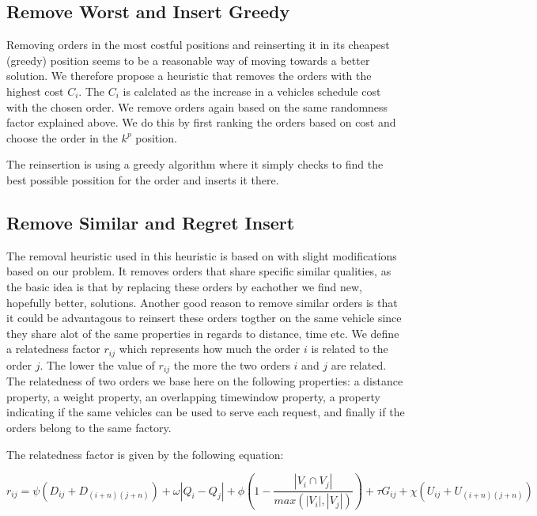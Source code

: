 \documentclass[../main.tex]{subfiles}
\begin{document}
\subsection{Remove Worst and Insert Greedy}
\label{sec:greedy}
Removing orders in the most costful positions and reinserting it in its cheapest (greedy) position seems to be a reasonable way of moving towards a better solution.
We therefore propose a heuristic that removes the orders with the highest cost $C_{i}$.
The $C_i$ is calclated as the increase in a vehicles schedule cost with the chosen order.
We remove orders again based on the same randomness factor explained above. We do this by first ranking the orders based on cost and choose the order in the $k^p$ position. \newline \par
The reinsertion is using a greedy algorithm where it simply checks to find the best possible possition for the order and inserts it there. 
\newline 
\subsection{Remove Similar and Regret Insert}
\label{sec:shaw}
The removal heuristic used in this heuristic is based on \citet{shaw97} with slight modifications based on our problem. 
It removes orders that share specific similar qualities, as the basic idea is that by replacing these orders by eachother we find new, hopefully better, solutions. 
Another good reason to remove similar orders is that it could be advantagous to reinsert these orders togther on the same vehicle since they share alot of the same properties in regards to distance, time etc.
We define a relatedness factor $r_{ij}$ which represents how much the order $i$ is related to the order $j$. 
The lower the value of $r_{ij}$ the more the two orders $i$ and $j$ are related.
The relatedness of two orders we base here on the following properties: 
a distance property, a weight property, an overlapping timewindow property, a property indicating if the same vehicles can be used to serve each request, and finally if the orders belong to the same factory.

The relatedness factor is given by the following equation:

\begin{equation}
\label{relatedness}
    r_{ij} = \psi ( D_{i j} + D_{(i+n)(j+n)}) + \omega|Q_i - Q_j|
    + \phi (1-\dfrac{|V_i\cap V_j|}{max(|V_i|, |V_j|)} ) + \tau G_{ij} + \chi (U_{ij} + U_{(i+n)(j+n)})
\end{equation}
\end{document}
